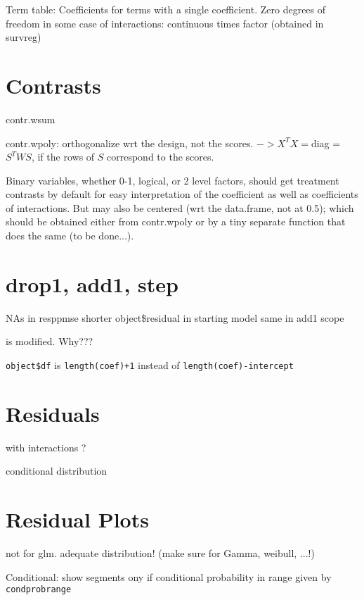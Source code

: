 \documentclass[11pt]{article}
\def\T{\texttt}
\begin{document}
Term table:
Coefficients for terms with a single coefficient.
Zero degrees of freedom in some case of interactions: continuous times
factor (obtained in survreg)


\section{Contrasts}
contr.wsum

contr.wpoly: orthogonalize wrt the design, not the scores.
$-> X^TX=$diag = $S^T W S$, if the rows of $S$ correspond to the scores.

Binary variables, whether 0-1, logical, or 2 level factors,
should get treatment contrasts by default for easy interpretation 
of the coefficient as well as coefficients of interactions.
But may also be centered (wrt the data.frame, not at 0.5);
which should be obtained either from contr.wpoly or by a tiny separate
function that does the same (to be done...).

\section{drop1, add1, step}
NAs 
\Itm in resppmse \Arrow shorter object\$residual
\Itm in starting model \Arrow same
\Itm in add1 scope 

is modified. Why???

\T{object\$df} is \T{length(coef)+1} instead of
\T{length(coef)-intercept}
\section{Residuals}
with interactions ?

conditional distribution

\section{Residual Plots}
not for glm. adequate distribution! (make sure for Gamma, weibull, ...!)

Conditional: show segments ony if conditional probability in range given by 
\T{condprobrange}
\end{document}
